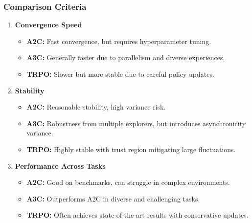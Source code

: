 \documentclass{beamer}
\begin{document}
\begin{frame}[fragile]
    \frametitle{Comparison Criteria}
    \begin{enumerate}
        \item \textbf{Convergence Speed}
        \begin{itemize}
            \item \textbf{A2C:} Fast convergence, but requires hyperparameter tuning.
            \item \textbf{A3C:} Generally faster due to parallelism and diverse experiences.
            \item \textbf{TRPO:} Slower but more stable due to careful policy updates.
        \end{itemize}
        
        \item \textbf{Stability}
        \begin{itemize}
            \item \textbf{A2C:} Reasonable stability, high variance risk.
            \item \textbf{A3C:} Robustness from multiple explorers, but introduces asynchronicity variance.
            \item \textbf{TRPO:} Highly stable with trust region mitigating large fluctuations.
        \end{itemize}
        
        \item \textbf{Performance Across Tasks}
        \begin{itemize}
            \item \textbf{A2C:} Good on benchmarks, can struggle in complex environments.
            \item \textbf{A3C:} Outperforms A2C in diverse and challenging tasks.
            \item \textbf{TRPO:} Often achieves state-of-the-art results with conservative updates.
        \end{itemize}
    \end{enumerate}
\end{frame}
\end{document}

